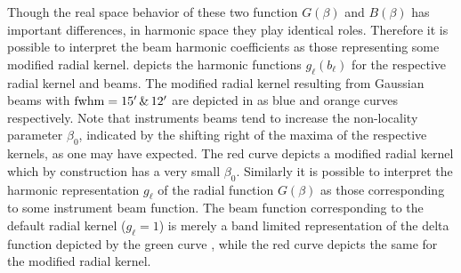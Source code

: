 Though the real space behavior of these two function $G(\beta)$ and $B(\beta)$ has important differences, in harmonic space they play identical roles. Therefore it is possible to interpret the beam harmonic coefficients as those representing some modified radial kernel.  depicts the harmonic functions $g_{\ell} (b_{\ell})$ for the respective radial kernel and beams.  The modified radial kernel resulting from Gaussian beams with ${\rm fwhm} =15' \,\&\, 12'$ are depicted in  as blue and orange curves respectively. Note that instruments  beams tend to increase the non-locality parameter $\beta_0$, indicated by the shifting right of the maxima of the respective kernels, as one may have expected. The red curve depicts a modified radial kernel which by construction has a very small $\beta_0$.  Similarly it is possible to interpret the harmonic representation $g_{\ell}$ of the radial function $G(\beta)$ as those corresponding to some instrument beam function. The beam function corresponding to the default radial kernel ($g_{\ell}=1$) is merely a band limited representation of the delta function depicted by the green curve , while the red curve depicts the same for the modified radial kernel.


